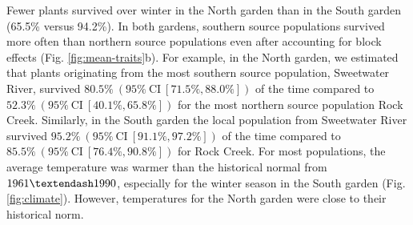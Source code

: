 \documentclass[
  12pt,
]{article}
\begin{document}
Fewer plants survived over winter in the North garden than in the South garden (65.5\% versus 94.2\%). In both gardens, southern source populations survived more often than northern source populations even after accounting for block effects (Fig. \ref{fig:mean-traits}b). For example, in the North garden, we estimated that plants originating from the most southern source population, Sweetwater River, survived \(80.5\%~(95\%~\text{CI}~[71.5\%, 88.0\%])\) of the time compared to \(52.3\%~(95\%~\text{CI}~[40.1\%, 65.8\%])\) for the most northern source population Rock Creek. Similarly, in the South garden the local population from Sweetwater River survived \(95.2\%~(95\%~\text{CI}~[91.1\%, 97.2\%])\) of the time compared to \(85.5\%~(95\%~\text{CI}~[76.4\%, 90.8\%])\) for Rock Creek. For most populations, the average temperature was warmer than the historical normal from \(1961 \textendash 1990\), especially for the winter season in the South garden (Fig. \ref{fig:climate}). However, temperatures for the North garden were close to their historical norm.
\end{document}
